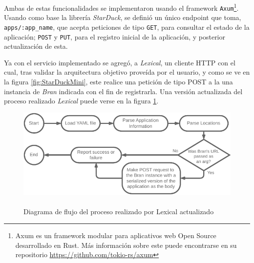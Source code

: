 Ambas de estas funcionalidades se implementaron usando el framework \texttt{Axum}\footnote{Axum es un framework modular para aplicativos web Open Source desarrollado en Rust. Más información sobre este puede encontrarse en su repositorio \url{https://github.com/tokio-rs/axum}}. Usando como base la librería \textit{StarDuck}, se definió un único endpoint que toma, \texttt{apps/:app\_name}, que acepta peticiones de tipo \texttt{GET}, para consultar el estado de la aplicación; \texttt{POST} y \texttt{PUT}, para el registro inicial de la aplicación, y posterior actualización de esta. 

Ya con el servicio implementado se agregó, a \textit{Lexical}, un cliente HTTP con el cual, tras validar la arquitectura objetivo proveída por el usuario, y como se ve en la figura \ref{fig:StarDuckMini}, este realice una petición de tipo POST a la una instancia de \textit{Bran} indicada con el fin de registrarla. Una versión actualizada del proceso realizado \textit{Lexical} puede verse en la figura \ref{fig:UpdatedLexicalFlow}.

\begin{figure}[ht]
    \centering
    \caption{\\Diagrama de flujo del proceso realizado por Lexical actualizado}
    \label{fig:UpdatedLexicalFlow}
    \includegraphics[width=0.9\linewidth]{images/UpdatedLexicalFlow.pdf}
\end{figure}